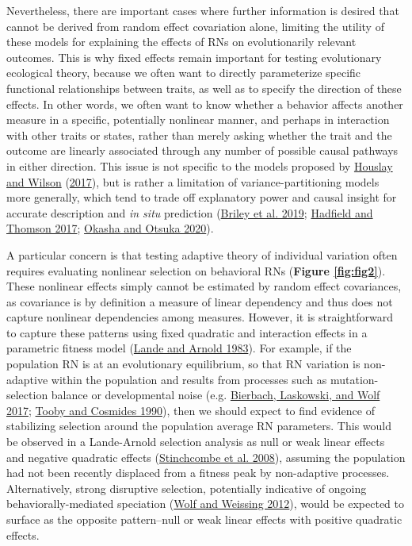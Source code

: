 \documentclass{article}
\begin{document}
Nevertheless, there are important cases where further information is
desired that cannot be derived from random effect covariation alone,
limiting the utility of these models for explaining the effects of RNs
on evolutionarily relevant outcomes. This is why fixed effects remain
important for testing evolutionary ecological theory, because we often
want to directly parameterize specific functional relationships between
traits, as well as to specify the direction of these effects. In other
words, we often want to know whether a behavior affects another measure
in a specific, potentially nonlinear manner, and perhaps in interaction
with other traits or states, rather than merely asking whether the trait
and the outcome are linearly associated through any number of possible
causal pathways in either direction. This issue is not specific to the
models proposed by \protect\hyperlink{ref-Hous2017}{Houslay and Wilson}
(\protect\hyperlink{ref-Hous2017}{2017}), but is rather a limitation of
variance-partitioning models more generally, which tend to trade off
explanatory power and causal insight for accurate description and
\emph{in situ} prediction (\protect\hyperlink{ref-Briley2019}{Briley et
al. 2019}; \protect\hyperlink{ref-Hadfield2017}{Hadfield and Thomson
2017}; \protect\hyperlink{ref-Okasha2020}{Okasha and Otsuka 2020}).

A particular concern is that testing adaptive theory of individual
variation often requires evaluating nonlinear selection on behavioral
RNs (\textbf{Figure \ref{fig:fig2}}). These nonlinear effects simply
cannot be estimated by random effect covariances, as covariance is by
definition a measure of linear dependency and thus does not capture
nonlinear dependencies among measures. However, it is straightforward to
capture these patterns using fixed quadratic and interaction effects in
a parametric fitness model (\protect\hyperlink{ref-Lande1983}{Lande and
Arnold 1983}). For example, if the population RN is at an evolutionary
equilibrium, so that RN variation is non-adaptive within the population
and results from processes such as mutation-selection balance or
developmental noise (e.g. \protect\hyperlink{ref-Bierbach2017}{Bierbach,
Laskowski, and Wolf 2017}; \protect\hyperlink{ref-Tooby1990}{Tooby and
Cosmides 1990}), then we should expect to find evidence of stabilizing
selection around the population average RN parameters. This would be
observed in a Lande-Arnold selection analysis as null or weak linear
effects and negative quadratic effects
(\protect\hyperlink{ref-Stinch2008}{Stinchcombe et al. 2008}), assuming
the population had not been recently displaced from a fitness peak by
non-adaptive processes. Alternatively, strong disruptive selection,
potentially indicative of ongoing behaviorally-mediated speciation
(\protect\hyperlink{ref-Wolf2012}{Wolf and Weissing 2012}), would be
expected to surface as the opposite pattern--null or weak linear effects
with positive quadratic effects.
\end{document}
